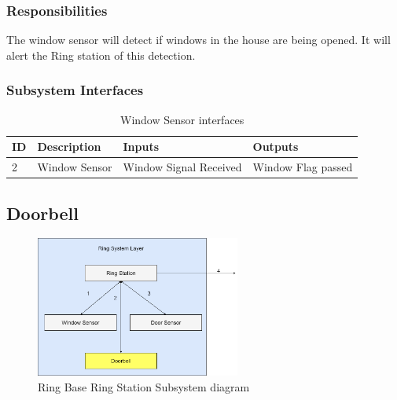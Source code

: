 \subsubsection{Responsibilities}
The window sensor will detect if windows in the house are being opened. It will alert the Ring station of this detection.

\subsubsection{Subsystem Interfaces}

\begin {table}[H]
\caption {Window Sensor interfaces} 
\begin{center}
    \begin{tabular}{ | p{1cm} | p{6cm} | p{3cm} | p{3cm} |}
    \hline
    ID & Description & Inputs & Outputs \\ \hline
    2 & Window Sensor & Window Signal Received & Window Flag passed  \\ \hline

    \end{tabular}
\end{center}
\end{table}

\subsection{Doorbell}

\begin{figure}[h!]
	\centering
 	\includegraphics[width=0.60\textwidth]{images/RingLayer.drawio3.png}
 \caption{Ring Base Ring Station Subsystem diagram}
\end{figure}

